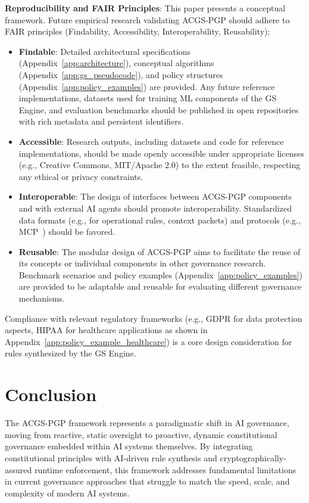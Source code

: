 \documentclass[sigconf,review,anonymous=false]{acmart} %
\begin{document}
\textbf{Reproducibility and FAIR Principles}: This paper presents a conceptual framework. Future empirical research validating ACGS-PGP should adhere to FAIR principles (Findability, Accessibility, Interoperability, Reusability):
\begin{itemize}
    \item \textbf{Findable}: Detailed architectural specifications (Appendix~\ref{app:architecture}), conceptual algorithms (Appendix~\ref{app:gs_pseudocode}), and policy structures (Appendix~\ref{app:policy_examples}) are provided. Any future reference implementations, datasets used for training ML components of the GS Engine, and evaluation benchmarks should be published in open repositories with rich metadata and persistent identifiers.
    \item \textbf{Accessible}: Research outputs, including datasets and code for reference implementations, should be made openly accessible under appropriate licenses (e.g., Creative Commons, MIT/Apache 2.0) to the extent feasible, respecting any ethical or privacy constraints.
    \item \textbf{Interoperable}: The design of interfaces between ACGS-PGP components and with external AI agents should promote interoperability. Standardized data formats (e.g., for operational rules, context packets) and protocols (e.g., MCP~\cite{ModelContextProtocolGitHub}) should be favored.
    \item \textbf{Reusable}: The modular design of ACGS-PGP aims to facilitate the reuse of its concepts or individual components in other governance research. Benchmark scenarios and policy examples (Appendix~\ref{app:policy_examples}) are provided to be adaptable and reusable for evaluating different governance mechanisms.
\end{itemize}
Compliance with relevant regulatory frameworks (e.g., GDPR for data protection aspects, HIPAA for healthcare applications as shown in Appendix~\ref{app:policy_example_healthcare}) is a core design consideration for rules synthesized by the GS Engine.

\section{Conclusion}
\label{sec:conclusion}
The ACGS-PGP framework represents a paradigmatic shift in AI governance, moving from reactive, static oversight to proactive, dynamic constitutional governance embedded within AI systems themselves. By integrating constitutional principles with AI-driven rule synthesis and cryptographically-assured runtime enforcement, this framework addresses fundamental limitations in current governance approaches that struggle to match the speed, scale, and complexity of modern AI systems.
\end{document}
